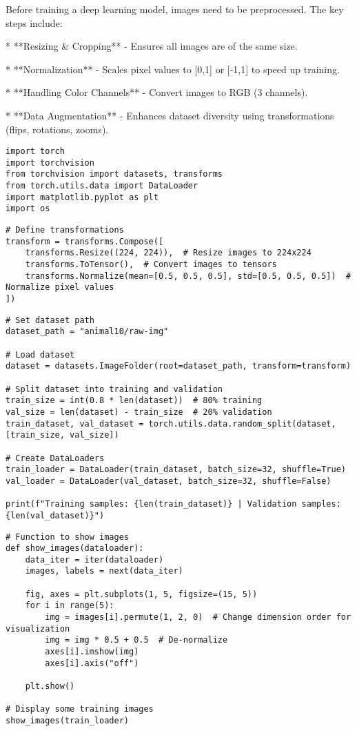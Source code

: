 \documentclass{article}
\begin{document}
Before training a deep learning model, images need to be preprocessed. The key steps include:

*  **Resizing & Cropping** - Ensures all images are of the same size.

*  **Normalization** - Scales pixel values to [0,1] or [-1,1] to speed up training.

*  **Handling Color Channels** - Convert images to RGB (3 channels).

*  **Data Augmentation** - Enhances dataset diversity using transformations (flips, rotations, zooms).

\begin{verbatim}
import torch
import torchvision
from torchvision import datasets, transforms
from torch.utils.data import DataLoader
import matplotlib.pyplot as plt
import os

\end{verbatim}

\begin{verbatim}
# Define transformations
transform = transforms.Compose([
    transforms.Resize((224, 224)),  # Resize images to 224x224
    transforms.ToTensor(),  # Convert images to tensors
    transforms.Normalize(mean=[0.5, 0.5, 0.5], std=[0.5, 0.5, 0.5])  # Normalize pixel values
])
\end{verbatim}

\begin{verbatim}
# Set dataset path
dataset_path = "animal10/raw-img"

# Load dataset
dataset = datasets.ImageFolder(root=dataset_path, transform=transform)

# Split dataset into training and validation
train_size = int(0.8 * len(dataset))  # 80% training
val_size = len(dataset) - train_size  # 20% validation
train_dataset, val_dataset = torch.utils.data.random_split(dataset, [train_size, val_size])

# Create DataLoaders
train_loader = DataLoader(train_dataset, batch_size=32, shuffle=True)
val_loader = DataLoader(val_dataset, batch_size=32, shuffle=False)

print(f"Training samples: {len(train_dataset)} | Validation samples: {len(val_dataset)}")

\end{verbatim}

\begin{verbatim}
# Function to show images
def show_images(dataloader):
    data_iter = iter(dataloader)
    images, labels = next(data_iter)

    fig, axes = plt.subplots(1, 5, figsize=(15, 5))
    for i in range(5):
        img = images[i].permute(1, 2, 0)  # Change dimension order for visualization
        img = img * 0.5 + 0.5  # De-normalize
        axes[i].imshow(img)
        axes[i].axis("off")

    plt.show()

# Display some training images
show_images(train_loader)
\end{verbatim}
\end{document}
